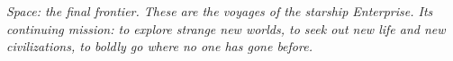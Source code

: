 \emph{Space: the final frontier. These are the voyages of the starship Enterprise.
Its continuing mission: to explore strange new worlds, to seek out new life and new civilizations,
to boldly go where no one has gone before.}
